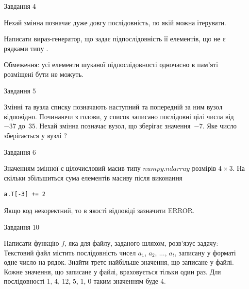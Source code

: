 \documentclass[12pt, ukrainian]{article}
\begin{document}
{               
{\begin{center}Завдання {4}\end{center}}
\vspace{-6mm}
Нехай змінна  позначає дуже довгу послідовність, по якій можна ітерувати.

Написати вираз-генератор, що задає підпослідовність її елементів, що не є рядками типу .

Обмеження: усі елементи шуканої підпослідовності одночасно в пам'яті розміщені бути не можуть.\par

\vspace{10mm}
               
{\begin{center}Завдання {5}\end{center}}
\vspace{-6mm}
Змінні  та  вузла списку позначають наступний та попередній за ним вузол відповідно. Починаючи з голови, у список записано послідовні цілі числа від~$-37$ до~$35$. Нехай змінна  позначає вузол, що зберігає значення~$-7$.
Яке число зберігається у вузлі  ?\par

               
{\begin{center}Завдання {6}\end{center}}
\vspace{-6mm}
Значенням змінної  є цілочисловий масив типу $numpy.ndarray$ розмірів $4{\times}3$. На скільки збільшиться сума елементів масиву  після виконання
\begin{verbatim}
a.T[-3] += 2
\end{verbatim}


Якщо код некоректний, то в якості відповіді зазначити ERROR.\par

               
{\begin{center}Завдання {10}\end{center}}
\vspace{-6mm}

Написати функцію $f$, яка для файлу, заданого шляхом, розв’язує задачу:\\ Текстовий файл містить послідовність чисел $a_1$, $a_2$, $\ldots$, $a_t$, записану у форматі одне число на рядок. Знайти третє найбільше значення, що записане у файлі. Кожне значення, що записане у файлі, враховується тільки один раз. Для послідовності 1, 4, 12, 5, 1, 0 таким значенням буде 4.

}
\end{document}
